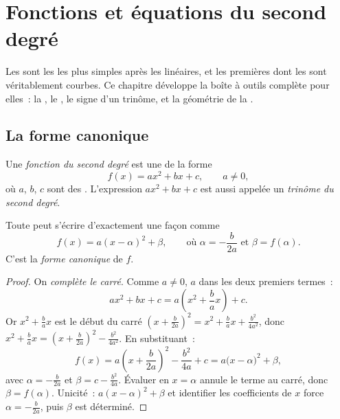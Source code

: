 \chapter{Fonctions et équations du second degré}\label{ch:g11:quad}

Les  sont les  les plus simples après
les linéaires, et les premières dont les  sont véritablement
courbes. Ce chapitre développe la boîte à outils complète pour elles~: la
, le , le signe d'un trinôme, et la géométrie
de la .

\section{La forme canonique}

\begin{definition}\label{def:g11:quad:quadratic}
Une \emph{fonction du second degré} est une
 de la forme
\[
f(x) = ax^2 + bx + c, \qquad a \neq 0,
\]
où $a$, $b$, $c$ sont des . L'expression $ax^2 + bx + c$ est
aussi appelée un \emph{trinôme du second degré}.
\end{definition}

\begin{theorem}\label{thm:g11:quad:canonical}
Toute  peut s'écrire d'exactement une façon comme
\[
f(x) = a(x - \alpha)^2 + \beta,
\qquad\text{où } \alpha = -\frac{b}{2a} \text{ et } \beta = f(\alpha).
\]
C'est la \emph{forme canonique} de $f$.
\end{theorem}

\begin{proof}
On \emph{complète le carré}. Comme $a \neq 0$,  $a$ dans les
deux premiers termes~:
\[
ax^2 + bx + c = a\left(x^2 + \frac{b}{a}x\right) + c .
\]
Or $x^2 + \frac{b}{a}x$ est le début du carré
$\left(x + \frac{b}{2a}\right)^2 = x^2 + \frac ba x + \frac{b^2}{4a^2}$,
donc $x^2 + \frac{b}{a}x = \left(x + \frac{b}{2a}\right)^2 -
\frac{b^2}{4a^2}$. En substituant~:
\[
f(x) = a\left(x + \frac{b}{2a}\right)^2 - \frac{b^2}{4a} + c
= a\bigl(x - \alpha\bigr)^2 + \beta,
\]
avec $\alpha = -\frac{b}{2a}$ et $\beta = c - \frac{b^2}{4a}$. Évaluer en
$x = \alpha$ annule le terme au carré, donc $\beta = f(\alpha)$.
Unicité~:  $a(x-\alpha)^2 + \beta$ et identifier les
coefficients de $x$ force $\alpha = -\frac{b}{2a}$, puis $\beta$ est
déterminé.
\end{proof}

